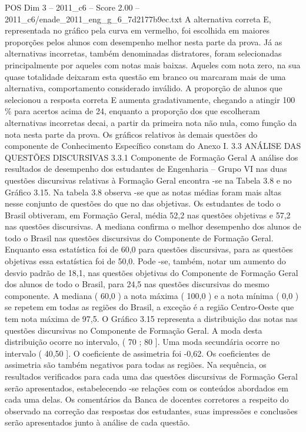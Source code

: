 \begin{textsample}{POS Dim 3 – 2011\_c6 – Score 2.00 – 2011\_c6/enade\_2011\_eng\_g\_6\_7d2177b9ec.txt}
A alternativa correta E, representada no gráfico pela curva em vermelho, foi escolhida em maiores proporções pelos alunos com desempenho melhor nesta parte da prova.
Já as alternativas incorretas, também denominadas distratores, foram selecionadas principalmente por aqueles com notas mais baixas.
Aqueles com nota zero, na sua quase totalidade deixaram esta questão em branco ou marcaram mais de uma alternativa, comportamento considerado inválido.
A proporção de alunos que selecionou a resposta correta E aumenta gradativamente, chegando a atingir 100 \% para acertos acima de 24, enquanto a proporção dos que escolheram alternativas incorretas decai, a partir da primeira nota não nula, como função da nota nesta parte da prova.
Os gráficos relativos às demais questões do componente de Conhecimento Específico constam do Anexo I. 3.3 ANÁLISE DAS QUESTÕES DISCURSIVAS 3.3.1 Componente de Formação Geral A análise dos resultados de desempenho dos estudantes de Engenharia – Grupo VI nas duas questões discursivas relativas à Formação Geral encontra -se na Tabela 3.8 e no Gráfico 3.15.
Na tabela 3.8 observa -se que as notas médias foram mais altas nesse conjunto de questões do que no das objetivas.
Os estudantes de todo o Brasil obtiveram, em Formação Geral, média 52,2 nas questões objetivas e 57,2 nas questões discursivas.
A mediana confirma o melhor desempenho dos alunos de todo o Brasil nas questões discursivas do Componente de Formação Geral.
Enquanto essa estatística foi de 60,0 para questões discursivas, para as questões objetivas essa estatística foi de 50,0.
Pode -se, também, notar um aumento do desvio padrão de 18,1, nas questões objetivas do Componente de Formação Geral dos alunos de todo o Brasil, para 24,5 nas questões discursivas do mesmo componente.
A mediana ( 60,0 ) a nota máxima ( 100,0 ) e a nota mínima ( 0,0 ) se repetem em todas as regiões do Brasil, a exceção é a região Centro-Oeste que tem nota máxima de 97,5.
O Gráfico 3.15 representa a distribuição das notas nas questões discursivas no Componente de Formação Geral.
A moda desta distribuição ocorre no intervalo, ( 70 ; 80 ].
Uma moda secundária ocorre no intervalo ( 40,50 ].
O coeficiente de assimetria foi -0,62.
Os coeficientes de assimetria são também negativos para todas as regiões.
Na sequência, os resultados verificados para cada uma das questões discursivas de Formação Geral serão apresentados, estabelecendo -se relações com os conteúdos abordados em cada uma delas.
Os comentários da Banca de docentes corretores a respeito do observado na correção das respostas dos estudantes, suas impressões e conclusões serão apresentados junto à análise de cada questão.

\end{textsample}
